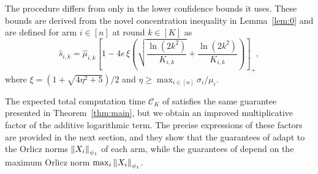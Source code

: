 
The  procedure differs from  only in the lower confidence bounds it uses. These bounds are derived from the novel concentration inequality in Lemma~\ref{lem:0} and are defined for arm $i \in [n]$ at round $k \in [K]$ as
\begin{equation}\label{def:s}
	\hat{s}_{i,k} =
	\hat{\mu}_{i,k} \left[ 1-4e\,\xi\left(\sqrt{\frac{\ln(2k^2)}{K_{i,k}}}+ \frac{\ln(2k^2)}{K_{i,k}} \right) \right]_{+},
\end{equation}
where $\xi = (1+\sqrt{4\eta^2+5})/2$ and $\eta \ge \max_{i \in [n]} \sigma_i/\mu_i$.

The expected total computation time $\mathcal{C}_K$ of  satisfies the same guarantee presented in Theorem~\ref{thm:main}, but we obtain an improved multiplicative factor of the additive logarithmic term. The precise expressions of these factors are provided in the next section, and they show that the guarantees of  adapt to the Orlicz norms $\left\| X_i \right\|_{\psi_1}$ of each arm, while the guarantees of  depend on the maximum Orlicz norm $\max_i\left\| X_i \right\|_{\psi_1}$.

